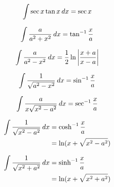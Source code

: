 \begin{multicols}{2}
	\begin{equation}
	\int \sec x \tan x \hspace{2pt}dx = \sec x
	\end{equation}
	
	\begin{equation}
	\int \frac{a}{a^2+x^2}\hspace{2pt}dx = \tan^{-1}\frac{x}{a}
	\end{equation}
	
	\begin{equation}
	\int \frac{a}{a^2-x^2}\hspace{2pt}dx = \frac{1}{2}\ln\left|\frac{x+a}{x-a}\right|
	\end{equation}
	
	\begin{equation}
	\int \frac{1}{\sqrt{a^2-x^2}} \hspace{2pt}dx = \sin^{-1} \frac{x}{a}
	\end{equation}
	
	\begin{equation}
	\int \frac{a}{x \sqrt{x^2-a^2}} \hspace{2pt}dx = \sec^{-1} \frac{x}{a}
	\end{equation}
	
	\begin{align}
	\int \frac{1}{\sqrt{x^2-a^2}} \hspace{2pt}dx &= \cosh^{-1} \frac{x}{a} \\&= \nonumber \ln (x+\sqrt{x^2-a^2})
	\end{align}
	
	\begin{align}
	\int \frac{1}{\sqrt{x^2+a^2}} \hspace{2pt}dx &= \sinh^{-1} \frac{x}{a} \\&=\nonumber \ln (x+\sqrt{x^2+a^2})
	\end{align}
	
\end{multicols}
